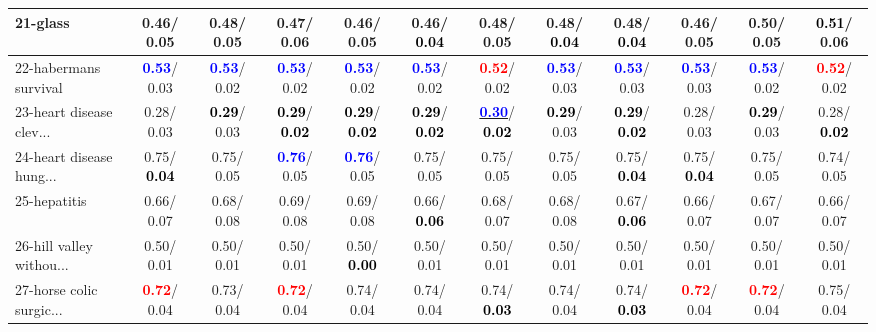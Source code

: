 \begin{table}[h]
\begin{center}
{\begin{tabular}{lc|c|c|c|c|c|c|c|c|c|c}
21-glass &   0.46/  0.05 &   0.48/  0.05 &   0.47/  0.06 &   0.46/  0.05 &   0.46/\textcolor{black}{\textbf{  0.04}} &   0.48/  0.05 &   0.48/\textcolor{black}{\textbf{  0.04}} &   0.48/\textcolor{black}{\textbf{  0.04}} &   0.46/  0.05 &   0.50/  0.05 & \textcolor{black}{\textbf{  0.51}}/  0.06 \\ \hline
22-habermans survival & \textcolor{blue}{\textbf{  0.53}}/  0.03 & \textcolor{blue}{\textbf{  0.53}}/  0.02 & \textcolor{blue}{\textbf{  0.53}}/  0.02 & \textcolor{blue}{\textbf{  0.53}}/  0.02 & \textcolor{blue}{\textbf{  0.53}}/  0.02 & \textcolor{red}{\textbf{  0.52}}/  0.02 & \textcolor{blue}{\textbf{  0.53}}/  0.03 & \textcolor{blue}{\textbf{  0.53}}/  0.03 & \textcolor{blue}{\textbf{  0.53}}/  0.03 & \textcolor{blue}{\textbf{  0.53}}/  0.02 & \textcolor{red}{\textbf{  0.52}}/  0.02 \\
23-heart disease clev... &   0.28/  0.03 & \textcolor{black}{\textbf{  0.29}}/  0.03 & \textcolor{black}{\textbf{  0.29}}/\textcolor{black}{\textbf{  0.02}} & \textcolor{black}{\textbf{  0.29}}/\textcolor{black}{\textbf{  0.02}} & \textcolor{black}{\textbf{  0.29}}/\textcolor{black}{\textbf{  0.02}} & \underline{\textcolor{blue}{\textbf{  0.30}}}/\textcolor{black}{\textbf{  0.02}} & \textcolor{black}{\textbf{  0.29}}/  0.03 & \textcolor{black}{\textbf{  0.29}}/\textcolor{black}{\textbf{  0.02}} &   0.28/  0.03 & \textcolor{black}{\textbf{  0.29}}/  0.03 &   0.28/\textcolor{black}{\textbf{  0.02}} \\
24-heart disease hung... &   0.75/\textcolor{black}{\textbf{  0.04}} &   0.75/  0.05 & \textcolor{blue}{\textbf{  0.76}}/  0.05 & \textcolor{blue}{\textbf{  0.76}}/  0.05 &   0.75/  0.05 &   0.75/  0.05 &   0.75/  0.05 &   0.75/\textcolor{black}{\textbf{  0.04}} &   0.75/\textcolor{black}{\textbf{  0.04}} &   0.75/  0.05 &   0.74/  0.05 \\
25-hepatitis &   0.66/  0.07 &   0.68/  0.08 &   0.69/  0.08 &   0.69/  0.08 &   0.66/\textcolor{black}{\textbf{  0.06}} &   0.68/  0.07 &   0.68/  0.08 &   0.67/\textcolor{black}{\textbf{  0.06}} &   0.66/  0.07 &   0.67/  0.07 &   0.66/  0.07 \\
26-hill valley withou... &   0.50/  0.01 &   0.50/  0.01 &   0.50/  0.01 &   0.50/\textcolor{black}{\textbf{  0.00}} &   0.50/  0.01 &   0.50/  0.01 &   0.50/  0.01 &   0.50/  0.01 &   0.50/  0.01 &   0.50/  0.01 &   0.50/  0.01 \\
27-horse colic surgic... & \textcolor{red}{\textbf{  0.72}}/  0.04 &   0.73/  0.04 & \textcolor{red}{\textbf{  0.72}}/  0.04 &   0.74/  0.04 &   0.74/  0.04 &   0.74/\textcolor{black}{\textbf{  0.03}} &   0.74/  0.04 &   0.74/\textcolor{black}{\textbf{  0.03}} & \textcolor{red}{\textbf{  0.72}}/  0.04 & \textcolor{red}{\textbf{  0.72}}/  0.04 &   0.75/  0.04 \\

\end{tabular}}
\end{center}
\end{table}
